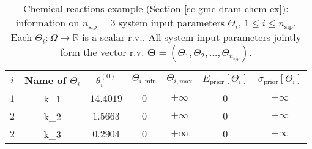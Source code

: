 \begin{table}[h!]
\begin{center}
\begin{tabular}{|c|c|c|c|c|c|c|}
\hline
 $i$      & Name of $\Theta_i$ & $\theta_i^{(0)}$ & $\Theta_{i,\text{min}}$ & $\Theta_{i,\text{max}}$ & $E_{\text{prior}}[\Theta_i]$ & $\sigma_{\text{prior}}[\Theta_i]$ \\
\hline
\hline
 $1$      & k\_1               & $14.4019$        & $0$                     & $+\infty$               & $0$                          & $+\infty$                         \\
\hline
 $2$      & k\_2               & $1.5663$         & $0$                     & $+\infty$               & $0$                          & $+\infty$                         \\
\hline
 $2$      & k\_3               & $0.2904$         & $0$                     & $+\infty$               & $0$                          & $+\infty$                         \\
\hline
\end{tabular}
\caption{Chemical reactions example (Section \ref{sc-gmc-dram-chem-ex}):
information on $n_{\text{sip}}=3$ system input parameters $\Theta_i$, $1\leqslant i\leqslant n_{\text{sip}}$.
Each $\Theta_i:\Omega\rightarrow\mathbb{R}$ is a scalar r.v..
All system input parameters jointly form the vector r.v. $\boldsymbol{\Theta}=(\Theta_1,\Theta_2,\ldots,\Theta_{n_{\text{sip}}})$.
}
\label{tab-dram-chem-ex-sys-input-params}
\end{center}
\end{table}

